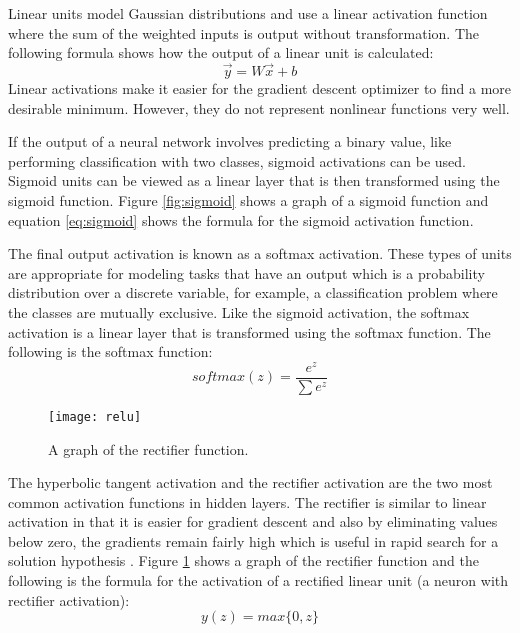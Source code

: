 Linear units model Gaussian distributions and use a linear activation function where the sum of the weighted inputs is output without transformation. The following formula shows how the output of a linear unit is calculated:
\begin{equation}
\vec{y} = W\vec{x} + b
\end{equation}
Linear activations make it easier for the gradient descent optimizer to find a more desirable minimum. However, they do not represent nonlinear functions very well\cite{Goodfellow-et-al-2016}.

If the output of a neural network involves predicting a binary value, like performing classification with two classes, sigmoid activations can be used. Sigmoid units can be viewed as a linear layer that is then transformed using the sigmoid function\cite{Goodfellow-et-al-2016}. Figure \ref{fig:sigmoid} shows a graph of a sigmoid function and equation \ref{eq:sigmoid} shows the formula for the sigmoid activation function.

The final output activation is known as a softmax activation. These types of units are appropriate for modeling tasks that have an output which is a probability distribution over a discrete variable, for example, a classification problem where the classes are mutually exclusive. Like the sigmoid activation, the softmax activation is a linear layer that is transformed using the softmax function\cite{Goodfellow-et-al-2016}. The following is the softmax function:
\begin{equation}
softmax(z) = \frac{e^z}{\sum{e^z}}
\end{equation}

\begin{figure}[t]
	\centering
	\texttt{[image: relu]}
	\caption{A graph of the rectifier function.}
	\label{fig:relu}
\end{figure}

The hyperbolic tangent activation and the rectifier activation are the two most common activation functions in hidden layers. The rectifier is similar to linear activation in that it is easier for gradient descent and also by eliminating values below zero, the gradients remain fairly high which is useful in rapid search for a solution hypothesis \cite{Goodfellow-et-al-2016}. Figure \ref{fig:relu} shows a graph of the rectifier function and the following is the formula for the activation of a rectified linear unit (a neuron with rectifier activation):
\begin{equation}
\label{eq:relu}
y(z) = max\{0, z\}
\end{equation} 

